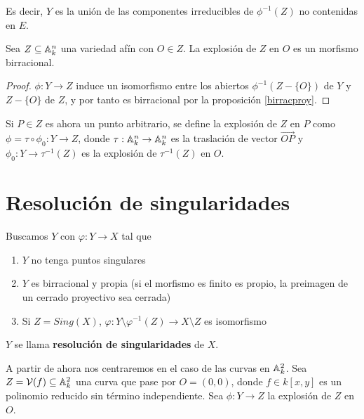 \documentclass[ACGA.tex]{subfiles}
\begin{document}
Es decir, $Y$ es la unión de las componentes irreducibles de $\phi^{-1}(Z)$ no contenidas en $E$. 

\begin{prop}
 Sea $Z\subseteq\mathbb{A}^n_k$ una variedad afín con $O\in Z$. La explosión de $Z$ en $O$ es un morfismo birracional.
\end{prop}

\begin{proof}
 $\phi:Y\to Z$ induce un isomorfismo entre los abiertos $\phi^{-1}(Z-\{O\})$ de $Y$ y $Z-\{O\}$ de $Z$, y por tanto es birracional por la proposición \ref{birracproy}.
\end{proof}

Si $P\in Z$ es ahora un punto arbitrario, se define la explosión de $Z$ en $P$ como $\phi=\tau\circ\phi_0:Y\to Z$, donde $\tau:\mathbb{A}^n_k\to\mathbb{A}^n_k$ es la traslación de vector $\overrightarrow{OP}$ y $\phi_0:Y\to\tau^{-1}(Z)$ es la explosión de $\tau^{-1}(Z)$ en $O$.

\section{Resolución de singularidades}

Buscamos $Y$ con $\varphi:Y\to X$ tal que 
\begin{enumerate}
\item $Y$ no tenga puntos singulares
\item $Y$ es birracional y propia (si el morfismo es finito es propio, la preimagen de un cerrado proyectivo sea cerrada)
\item Si $Z=Sing(X)$, $\varphi:Y\setminus\varphi^{-1}(Z)\to X\setminus Z$ es isomorfismo
\end{enumerate}
$Y$ se llama \textbf{resolución de singularidades} de $X$.


A partir de ahora nos centraremos en el caso de las curvas en $\mathbb{A}^2_k$. Sea $Z=\mathcal{V}(f)\subseteq\mathbb{A}^2_k$ una curva que pase por $O=(0,0)$, donde $f\in k[x,y]$ es un polinomio reducido sin término independiente. Sea $\phi:Y\to Z$ la explosión de $Z$ en $O$. 
\end{document}
